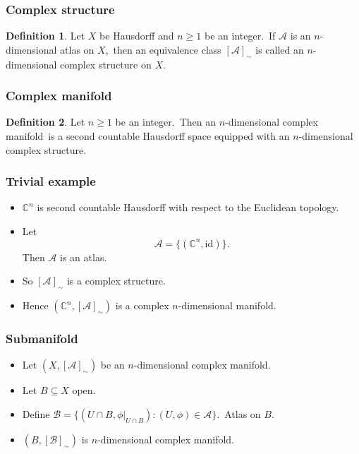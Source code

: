 \documentclass[usenames,dvipsnames]{beamer}
\theoremstyle{definition}
\newtheorem{defi}{Definition}
\begin{document}
\begin{frame}
  \frametitle{Complex structure}
  \begin{defi}
    Let $X$ be Hausdorff and $n\geq 1$ be an integer.\pause~If $\mathcal{A}$ is an $n$-dimensional atlas on $X$,\pause~then an equivalence class $[\mathcal{A}]_{\sim}$ is called an $n$-dimensional complex structure on $X$.
  \end{defi}
\end{frame}

\begin{frame}
  \frametitle{Complex manifold}
  \begin{defi}
    Let $n\geq 1$ be an integer.\pause~Then an $n$-dimensional complex manifold\pause~is a second countable Hausdorff space equipped with an $n$-dimensional complex structure.
  \end{defi}
\end{frame}

\begin{frame}
  \frametitle{Trivial example}
    \begin{itemize}
      \item $\mathbb{C}^n$ is second countable Hausdorff with respect to the Euclidean topology.\pause
      \item Let\pause
        \[\mathcal{A}=\{(\mathbb{C}^n,\mathrm{id})\}.\]\pause
        Then $\mathcal{A}$ is an atlas.\pause
      \item So $[\mathcal{A}]_{\sim}$ is a complex structure.\pause
      \item Hence $(\mathbb{C}^n,[\mathcal{A}]_{\sim})$ is a complex $n$-dimensional manifold.
    \end{itemize}
\end{frame}

\begin{frame}
  \frametitle{Submanifold}
  \begin{itemize}
    \item Let $(X,[\mathcal{A}]_{\sim})$ be an $n$-dimensional complex manifold.\pause
    \item Let $B\subseteq X$ open.\pause
    \item Define $\mathcal{B}=\{(U\cap B,\phi|_{U\cap B}):(U,\phi)\in\mathcal{A}\}$.\pause~Atlas on $B$.\pause
    \item $(B,[\mathcal{B}]_{\sim})$ is $n$-dimensional complex manifold.
  \end{itemize}
\end{frame}
\end{document}
